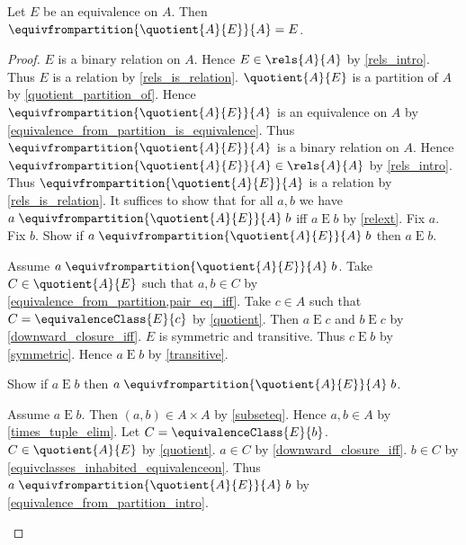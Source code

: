 \begin{proposition}\label{equivalence_from_quotient}
    Let $E$ be an equivalence on $A$.
    Then $\equivfrompartition{\quotient{A}{E}}{A} = E$.
\end{proposition}
\begin{proof}
    $E$ is a binary relation on $A$.
    Hence $E\in\rels{A}{A}$ by \cref{rels_intro}.
    Thus $E$ is a relation by \cref{rels_is_relation}.
    $\quotient{A}{E}$ is a partition of $A$
        by \cref{quotient_partition_of}.
    Hence $\equivfrompartition{\quotient{A}{E}}{A}$ is an equivalence on $A$
        by \cref{equivalence_from_partition_is_equivalence}.
    Thus $\equivfrompartition{\quotient{A}{E}}{A}$ is a binary relation on $A$.
    Hence $\equivfrompartition{\quotient{A}{E}}{A}\in\rels{A}{A}$
        by \cref{rels_intro}.
    Thus $\equivfrompartition{\quotient{A}{E}}{A}$ is a relation
        by \cref{rels_is_relation}.
    It suffices to show that for all $a,b$ we have
        $a\mathrel{\equivfrompartition{\quotient{A}{E}}{A}}b$ iff
        $a\mathrel{E}b$
        by \cref{relext}.
    Fix $a$.
    Fix $b$.
    Show if $a\mathrel{\equivfrompartition{\quotient{A}{E}}{A}}b$ then
        $a\mathrel{E}b$.
    \begin{subproof}
        Assume $a\mathrel{\equivfrompartition{\quotient{A}{E}}{A}}b$.
        Take $C\in\quotient{A}{E}$ such that $a,b\in C$
            by \cref{equivalence_from_partition,pair_eq_iff}.
        Take $c\in A$ such that $C=\equivalenceClass{E}{c}$
            by \cref{quotient}.
        Then $a\mathrel{E}c$ and $b\mathrel{E}c$
            by \cref{downward_closure_iff}.
        $E$ is symmetric and transitive.
        Thus $c\mathrel{E}b$ by \cref{symmetric}.
        Hence $a\mathrel{E}b$ by \cref{transitive}.
    \end{subproof}
    Show if $a\mathrel{E}b$ then
        $a\mathrel{\equivfrompartition{\quotient{A}{E}}{A}}b$.
    \begin{subproof}
        Assume $a\mathrel{E}b$.
        Then $(a,b)\in A\times A$ by \cref{subseteq}.
        Hence $a,b\in A$ by \cref{times_tuple_elim}.
        Let $C=\equivalenceClass{E}{b}$.
        $C\in\quotient{A}{E}$ by \cref{quotient}.
        $a\in C$ by \cref{downward_closure_iff}.
        $b\in C$ by \cref{equivclasses_inhabited_equivalenceon}.
        Thus $a\mathrel{\equivfrompartition{\quotient{A}{E}}{A}}b$
            by \cref{equivalence_from_partition_intro}.
    \end{subproof}
\end{proof}

